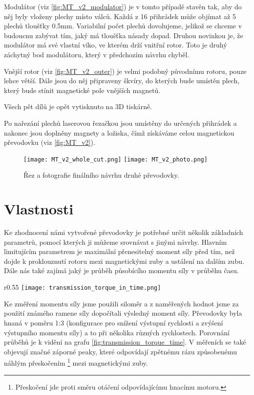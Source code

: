 Modulátor (viz \autoref{fig:MT_v2_modulator}) je v tomto případě stavěn tak, aby do něj byly vloženy plechy místo válců. Každá z 16 přihrádek může objímat až 5 plechů tloušťky 0.5mm. Variabilní počet plechů dovolujeme, jelikož se chceme v budoucnu zabývat tím, jaký má tloušťka násady dopad. Druhou novinkou je, že modulátor má své vlastní víko, ve kterém drží vnitřní rotor. Toto je druhý záchytný bod modulátoru, který v předchozím návrhu chyběl.

Vnější rotor (viz \autoref{fig:MT_v2_outer}) je velmi podobný původnímu rotoru, pouze lehce větší. Dále jsou do něj připraveny škvíry, do kterých bude umístěn plech, který bude stínit magnetické pole vnějších magnetů.

\clearpage
{
    Všech pět dílů je opět vytisknuto na 3D tiskárně. 
    \raggedright
    Po nařezání plechů laserovou řezačkou jsou umístěny do určených přihrádek a nakonec jsou doplněny magnety a ložiska, čímž získáváme celou magnetickou převodovku (viz \autoref{fig:MT_v2}).
}

\begin{figure}[H]
    \texttt{[image: MT\_v2\_whole\_cut.png]}
    \texttt{[image: MT\_v2\_photo.png]}
    \centering
    \caption{Řez a fotografie finálního návrhu druhé převodovky.}
    \label{fig:MT_v2}
\end{figure}

\section{Vlastnosti}

Ke zhodnocení námi vytvořené převodovky je potřebné určit několik základních parametrů, pomocí kterých ji můžeme srovnávat s jinými návrhy. Hlavním limitujícím parametrem je maximální přenesitelný moment síly před tím, než dojde k proklouznutí rotoru mezi magnetickými zuby a ustálení na dalším zubu. Dále nás také zajímá jaký je průběh působícího momentu síly v průběhu času.

\begin{wrapfigure}{r}{0.55\textwidth}
    \vspace{-1cm}
    \texttt{[image: transmission\_torque\_in\_time.png]}
    \caption{Průběh momentu síly v čase při různých úhlových rychlostech u převodovky v konfiguraci 1:3}
    \label{fig:transmission_torque_time}
\end{wrapfigure}

Ke změření momentu síly jsme použili siloměr a z naměřených hodnot jsme za použití známého ramene síly dopočítali výsledný moment síly. Převodovky byla hnaná v poměru 1:3 (konfigurace pro snížení výstupní rychlosti a zvýšení výstupního momentu síly) a to při několika různých rychlostech. Porovnání průběhů je k vidění na grafu \ref{fig:transmission_torque_time}. V měřeních se také objevují značné záporné peaky, které odpovídají zpětnému rázu způsobenému náhlým přeskočením \footnote{Přeskočení jde proti směru otáčení odpovídajícímu hnacímu motoru.} mezi magnetickými zuby.

